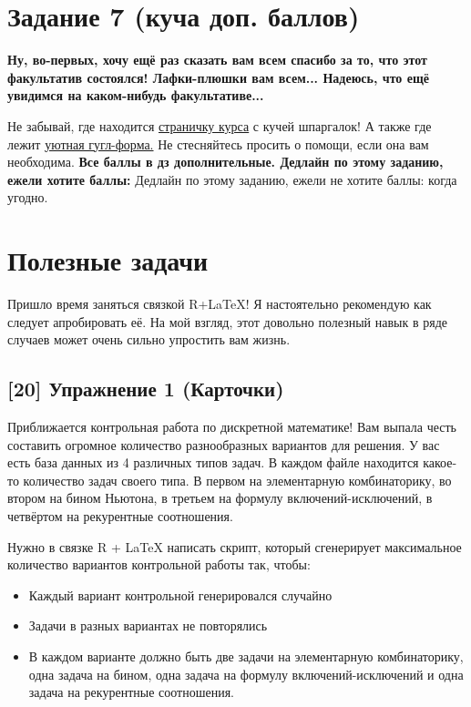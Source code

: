 \documentclass[12pt, a4paper, oneside]{article}
\begin{document}
\section*{Задание 7 (куча доп. баллов)  }

\textbf{Ну, во-первых, хочу ещё раз сказать вам всем спасибо за то, что этот факультатив состоялся! Лафки-плюшки вам всем... Надеюсь, что ещё увидимся на каком-нибудь факультативе...} 

Не забывай, где находится  \href{https://fulyankin.github.io/LaTeX/}{страничку курса} с кучей шпаргалок! А также где лежит \href{https://docs.google.com/forms/d/e/1FAIpQLSe11kxKVfv07iCL1E9yNX7ll9swKImiVwRr1H70lslGzInRSg/viewform}{уютная гугл-форма.} Не стесняйтесь просить о помощи, если она вам необходима. \textbf{Все баллы в дз дополнительные. Дедлайн по этому заданию, ежели хотите баллы: }  Дедлайн по этому заданию, ежели не хотите баллы: когда угодно.


\section*{Полезные задачи}

Пришло время заняться связкой R+LaTeX! Я настоятельно рекомендую как следует апробировать её. На мой взгляд, этот довольно полезный навык в ряде случаев может очень сильно упростить вам жизнь.

\subsection*{[20] Упражнение 1 (Карточки)}

Приближается контрольная работа по дискретной математике! Вам выпала честь составить огромное количество разнообразных вариантов для решения. У вас есть  база данных из 4 различных типов задач.   В каждом файле находится какое-то количество задач своего типа. В первом на элементарную комбинаторику, во втором на бином Ньютона, в третьем на формулу включений-исключений, в четвёртом на рекурентные соотношения.

Нужно в связке R + \LaTeX{} написать скрипт, который сгенерирует максимальное количество вариантов контрольной работы так, чтобы:

\begin{itemize}
\item Каждый вариант контрольной генерировался случайно
\item Задачи в разных вариантах не повторялись
\item В каждом варианте должно быть две задачи на элементарную комбинаторику, одна задача на бином, одна задача на формулу включений-исключений и одна задача на рекурентные соотношения.
\end{itemize}
\end{document}
